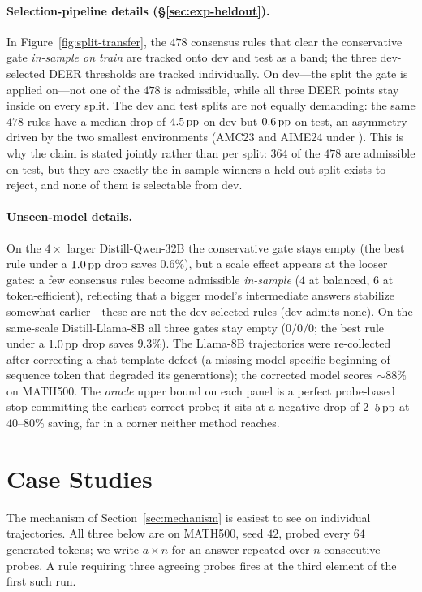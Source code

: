 \paragraph{Selection-pipeline details (\S\ref{sec:exp-heldout}).}
In Figure~\ref{fig:split-transfer}, the $478$ consensus rules that clear the
conservative gate \emph{in-sample on train} are tracked onto dev and test as a
band; the three dev-selected DEER thresholds are tracked individually. On
dev---the split the gate is applied on---not one of the $478$ is admissible,
while all three DEER points stay inside on every split. The dev and test splits
are not equally demanding: the same $478$ rules have a median drop of $4.5\,\text{pp}$
on dev but $0.6\,\text{pp}$ on test, an asymmetry driven by the two smallest
environments (AMC23 and AIME24 under \qweneight{}).
This is why the claim is stated jointly rather than per split: $364$ of the
$478$ are admissible on test, but they are exactly the in-sample winners a
held-out split exists to reject, and none of them is selectable from dev.

\paragraph{Unseen-model details.}
On the $4\times$ larger \mbox{Distill-Qwen-32B} the conservative gate stays
empty (the best rule under a $1.0\,\text{pp}$ drop saves $0.6\%$), but a scale effect
appears at the looser gates: a few consensus rules become admissible
\emph{in-sample} ($4$ at balanced, $6$ at token-efficient), reflecting that a
bigger model's intermediate answers stabilize somewhat earlier---these are not
the dev-selected rules (dev admits none). On the same-scale
\mbox{Distill-Llama-8B} all three gates stay empty ($0/0/0$; the best rule
under a $1.0\,\text{pp}$ drop saves $9.3\%$). The Llama-8B trajectories were
re-collected after correcting a chat-template defect (a missing model-specific
beginning-of-sequence token that degraded its generations); the corrected model
scores $\sim\!88\%$ on \textsc{MATH}500. The \emph{oracle} upper bound on each
panel is a perfect probe-based stop committing the earliest correct probe; it
sits at a negative drop of $2$--$5\,\text{pp}$ at $40$--$80\%$ saving, far in a corner
neither method reaches.

\section{Case Studies}
\label{sec:appendix-cases}

The mechanism of Section~\ref{sec:mechanism} is easiest to see on individual
trajectories. All three below are \dsseven{} on \textsc{MATH}500, seed $42$,
probed every $64$ generated tokens; we write $a\times n$ for an answer
repeated over $n$ consecutive probes. A rule requiring three agreeing probes
fires at the third element of the first such run.

